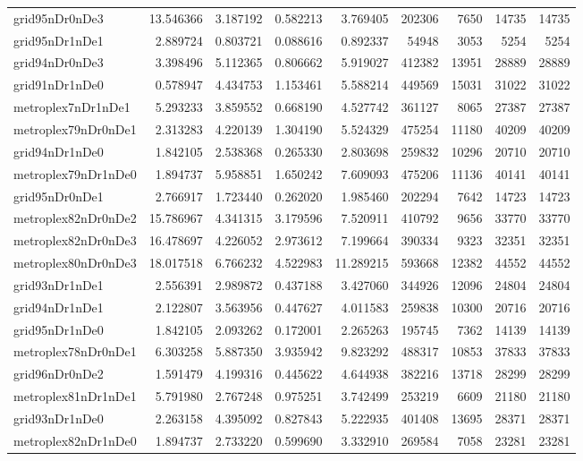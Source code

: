 \begin{longtable}{|l|r|r|r|r|r|r|r|r|}
grid95nDr0nDe3 & 13.546366 & 3.187192 & 0.582213 & 3.769405 & 202306 & 7650 & 14735 & 14735 \\
grid95nDr1nDe1 & 2.889724 & 0.803721 & 0.088616 & 0.892337 & 54948 & 3053 & 5254 & 5254 \\
grid94nDr0nDe3 & 3.398496 & 5.112365 & 0.806662 & 5.919027 & 412382 & 13951 & 28889 & 28889 \\
grid91nDr1nDe0 & 0.578947 & 4.434753 & 1.153461 & 5.588214 & 449569 & 15031 & 31022 & 31022 \\
metroplex7nDr1nDe1 & 5.293233 & 3.859552 & 0.668190 & 4.527742 & 361127 & 8065 & 27387 & 27387 \\
metroplex79nDr0nDe1 & 2.313283 & 4.220139 & 1.304190 & 5.524329 & 475254 & 11180 & 40209 & 40209 \\
grid94nDr1nDe0 & 1.842105 & 2.538368 & 0.265330 & 2.803698 & 259832 & 10296 & 20710 & 20710 \\
metroplex79nDr1nDe0 & 1.894737 & 5.958851 & 1.650242 & 7.609093 & 475206 & 11136 & 40141 & 40141 \\
grid95nDr0nDe1 & 2.766917 & 1.723440 & 0.262020 & 1.985460 & 202294 & 7642 & 14723 & 14723 \\
metroplex82nDr0nDe2 & 15.786967 & 4.341315 & 3.179596 & 7.520911 & 410792 & 9656 & 33770 & 33770 \\
metroplex82nDr0nDe3 & 16.478697 & 4.226052 & 2.973612 & 7.199664 & 390334 & 9323 & 32351 & 32351 \\
metroplex80nDr0nDe3 & 18.017518 & 6.766232 & 4.522983 & 11.289215 & 593668 & 12382 & 44552 & 44552 \\
grid93nDr1nDe1 & 2.556391 & 2.989872 & 0.437188 & 3.427060 & 344926 & 12096 & 24804 & 24804 \\
grid94nDr1nDe1 & 2.122807 & 3.563956 & 0.447627 & 4.011583 & 259838 & 10300 & 20716 & 20716 \\
grid95nDr1nDe0 & 1.842105 & 2.093262 & 0.172001 & 2.265263 & 195745 & 7362 & 14139 & 14139 \\
metroplex78nDr0nDe1 & 6.303258 & 5.887350 & 3.935942 & 9.823292 & 488317 & 10853 & 37833 & 37833 \\
grid96nDr0nDe2 & 1.591479 & 4.199316 & 0.445622 & 4.644938 & 382216 & 13718 & 28299 & 28299 \\
metroplex81nDr1nDe1 & 5.791980 & 2.767248 & 0.975251 & 3.742499 & 253219 & 6609 & 21180 & 21180 \\
grid93nDr1nDe0 & 2.263158 & 4.395092 & 0.827843 & 5.222935 & 401408 & 13695 & 28371 & 28371 \\
metroplex82nDr1nDe0 & 1.894737 & 2.733220 & 0.599690 & 3.332910 & 269584 & 7058 & 23281 & 23281 \\

\end{longtable}
